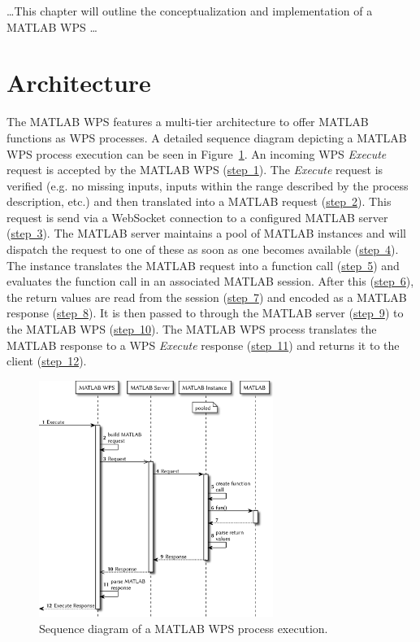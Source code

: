 	\dots This chapter will outline the conceptualization and implementation of a MATLAB WPS \dots

	

	\section{Architecture}
		The MATLAB WPS features a multi-tier architecture to offer MATLAB functions as \acl{WPS} processes. A detailed sequence diagram depicting a MATLAB WPS process execution can be seen in Figure~\ref{fig:sd:mwps}. An incoming WPS \emph{Execute} request is accepted by the MATLAB WPS (\hyperref[fig:sd:mwps]{step~1}). The \emph{Execute} request is verified (e.g. no missing inputs, inputs within the range described by the process description, etc.) and then translated into a MATLAB request (\hyperref[fig:sd:mwps]{step~2}). This request is send via a WebSocket connection to a configured MATLAB server (\hyperref[fig:sd:mwps]{step~3}). The MATLAB server maintains a pool of MATLAB instances and will dispatch the request to one of these as soon as one becomes available (\hyperref[fig:sd:mwps]{step~4}). The instance translates the MATLAB request into a function call (\hyperref[fig:sd:mwps]{step~5}) and evaluates the function call in an associated MATLAB session. After this (\hyperref[fig:sd:mwps]{step~6}), the return values are read from the session (\hyperref[fig:sd:mwps]{step~7}) and encoded as a MATLAB response (\hyperref[fig:sd:mwps]{step~8}). It is then passed to through the MATLAB server (\hyperref[fig:sd:mwps]{step~9}) to the MATLAB WPS (\hyperref[fig:sd:mwps]{step~10}). The MATLAB WPS process translates the MATLAB response to a WPS \emph{Execute} response (\hyperref[fig:sd:mwps]{step~11}) and returns it to the client (\hyperref[fig:sd:mwps]{step~12}).

		\begin{figure}[!htb]
			\centering
			\includegraphics[width=0.6788732394366197\textwidth]{figures/sequence-diagramm-mwps.pdf}
			\caption{\label{fig:sd:mwps} Sequence diagram of a MATLAB WPS process execution.}
		\end{figure}

